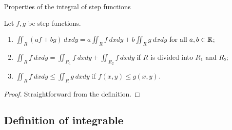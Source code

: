{Properties of the integral of step functions}

\begin{theorem}
    Let \(f,g\) be step functions.
    \begin{enumerate}
        \item \(\displaystyle \iint_{R} (a f + b g) \ dxdy = a \displaystyle \iint_{R} f \ dxdy + b \displaystyle\iint_{R} g \ dxdy\) for all \(a,b\in \mathbb{R}\);
        \item \(\displaystyle\iint_{R} f \ dxdy =  \displaystyle\iint_{R_1} f \ dxdy + \displaystyle \iint_{R_2} f \ dxdy\) if \(R\) is divided into \(R_1\) and \(R_2\);
        \item \(\displaystyle\iint_{R} f \ dxdy \leq \displaystyle \iint_{R} g \ dxdy\) if \(f(x,y) \leq g(x,y)\).
    \end{enumerate}
\end{theorem}

\begin{proof}
    Straightforward from the definition.
\end{proof}




% 


% 

\subsection{Definition of integrable}



